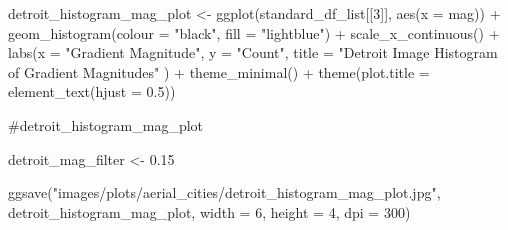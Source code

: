 \documentclass[
  letterpaper,
  DIV=11,
  numbers=noendperiod]{scrreprt}
\newenvironment{Shaded}{\begin{snugshade}}{\end{snugshade}}
\newcommand{\AttributeTok}[1]{\textcolor[rgb]{0.40,0.45,0.13}{#1}}
\newcommand{\CommentTok}[1]{\textcolor[rgb]{0.37,0.37,0.37}{#1}}
\newcommand{\DecValTok}[1]{\textcolor[rgb]{0.68,0.00,0.00}{#1}}
\newcommand{\FloatTok}[1]{\textcolor[rgb]{0.68,0.00,0.00}{#1}}
\newcommand{\FunctionTok}[1]{\textcolor[rgb]{0.28,0.35,0.67}{#1}}
\newcommand{\NormalTok}[1]{\textcolor[rgb]{0.00,0.23,0.31}{#1}}
\newcommand{\OtherTok}[1]{\textcolor[rgb]{0.00,0.23,0.31}{#1}}
\newcommand{\SpecialCharTok}[1]{\textcolor[rgb]{0.37,0.37,0.37}{#1}}
\newcommand{\StringTok}[1]{\textcolor[rgb]{0.13,0.47,0.30}{#1}}
\begin{document}
\begin{Shaded}
\begin{Highlighting}[]
\NormalTok{detroit\_histogram\_mag\_plot }\OtherTok{\textless{}{-}}
  \FunctionTok{ggplot}\NormalTok{(standard\_df\_list[[}\DecValTok{3}\NormalTok{]], }
         \FunctionTok{aes}\NormalTok{(}\AttributeTok{x =}\NormalTok{ mag)) }\SpecialCharTok{+}
  \FunctionTok{geom\_histogram}\NormalTok{(}\AttributeTok{colour =} \StringTok{"black"}\NormalTok{, }\AttributeTok{fill =} \StringTok{"lightblue"}\NormalTok{) }\SpecialCharTok{+}
  \FunctionTok{scale\_x\_continuous}\NormalTok{() }\SpecialCharTok{+} 
  \FunctionTok{labs}\NormalTok{(}\AttributeTok{x =} \StringTok{"Gradient Magnitude"}\NormalTok{, }
       \AttributeTok{y =} \StringTok{"Count"}\NormalTok{, }
       \AttributeTok{title =} \StringTok{"Detroit Image Histogram of Gradient Magnitudes"}
\NormalTok{       ) }\SpecialCharTok{+}
  \FunctionTok{theme\_minimal}\NormalTok{() }\SpecialCharTok{+}
  \FunctionTok{theme}\NormalTok{(}\AttributeTok{plot.title =} \FunctionTok{element\_text}\NormalTok{(}\AttributeTok{hjust =} \FloatTok{0.5}\NormalTok{))}

\CommentTok{\#detroit\_histogram\_mag\_plot}

\NormalTok{detroit\_mag\_filter }\OtherTok{\textless{}{-}} \FloatTok{0.15}

\FunctionTok{ggsave}\NormalTok{(}\StringTok{"images/plots/aerial\_cities/detroit\_histogram\_mag\_plot.jpg"}\NormalTok{, detroit\_histogram\_mag\_plot, }\AttributeTok{width =} \DecValTok{6}\NormalTok{, }\AttributeTok{height =} \DecValTok{4}\NormalTok{, }\AttributeTok{dpi =} \DecValTok{300}\NormalTok{)}
\end{Highlighting}
\end{Shaded}
\end{document}

